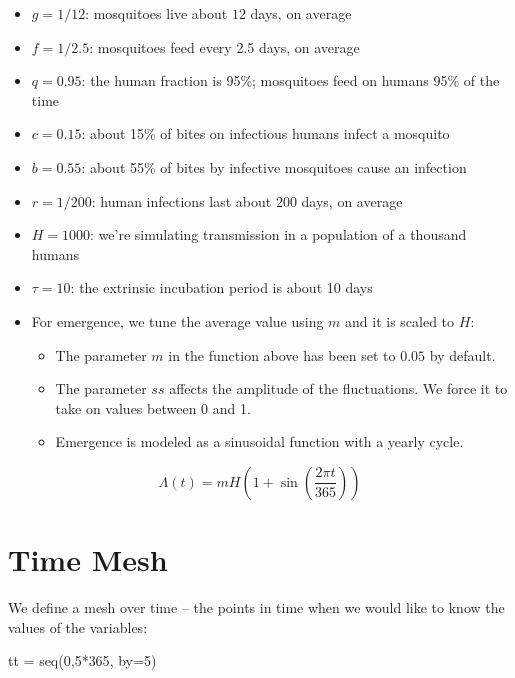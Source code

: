 \documentclass[
]{book}
\newenvironment{Shaded}{\begin{snugshade}}{\end{snugshade}}
\newcommand{\AttributeTok}[1]{\textcolor[rgb]{0.77,0.63,0.00}{#1}}
\newcommand{\DecValTok}[1]{\textcolor[rgb]{0.00,0.00,0.81}{#1}}
\newcommand{\FunctionTok}[1]{\textcolor[rgb]{0.00,0.00,0.00}{#1}}
\newcommand{\NormalTok}[1]{#1}
\newcommand{\OtherTok}[1]{\textcolor[rgb]{0.56,0.35,0.01}{#1}}
\newcommand{\SpecialCharTok}[1]{\textcolor[rgb]{0.00,0.00,0.00}{#1}}
\begin{document}
\begin{itemize}
\item
  \(g=1/12\): mosquitoes live about \(12\) days, on average
\item
  \(f=1/2.5\): mosquitoes feed every 2.5 days, on average
\item
  \(q=0.95\): the human fraction is 95\%; mosquitoes feed on humans 95\% of the time
\item
  \(c=0.15\): about 15\% of bites on infectious humans infect a mosquito
\item
  \(b=0.55\): about 55\% of bites by infective mosquitoes cause an infection
\item
  \(r=1/200\): human infections last about \(200\) days, on average
\item
  \(H=1000\): we're simulating transmission in a population of a thousand humans
\item
  \(\tau=10\): the extrinsic incubation period is about 10 days
\item
  For emergence, we tune the average value using \(m\) and it is scaled to \(H\):

  \begin{itemize}
  \item
    The parameter \(m\) in the function above has been set to \(0.05\) by default.
  \item
    The parameter \(ss\) affects the amplitude of the fluctuations. We force it to take on values between 0 and 1.
  \item
    Emergence is modeled as a sinusoidal function with a yearly cycle.
  \end{itemize}
\end{itemize}

\[\Lambda(t) = m H \left(1 + \sin \left(\frac{2\pi t}{365}\right)\right)\]

\hypertarget{time-mesh}{%
\section{Time Mesh}\label{time-mesh}}

We define a mesh over time -- the points in time when we would like to know the values of the variables:

\begin{Shaded}
\begin{Highlighting}[]
\NormalTok{tt }\OtherTok{=} \FunctionTok{seq}\NormalTok{(}\DecValTok{0}\NormalTok{,}\DecValTok{5}\SpecialCharTok{*}\DecValTok{365}\NormalTok{, }\AttributeTok{by=}\DecValTok{5}\NormalTok{) }
\end{Highlighting}
\end{Shaded}
\end{document}
